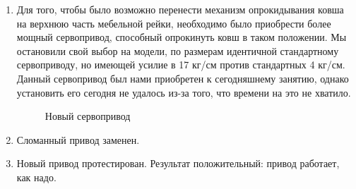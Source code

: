 \begin{enumerate}
\begin{enumerate}
	  \item Для того, чтобы было возможно перенести механизм опрокидывания ковша на верхнюю часть мебельной рейки, необходимо было приобрести более мощный сервопривод, способный опрокинуть ковш в таком положении. Мы остановили свой выбор на модели, по размерам идентичной стандартному сервоприводу, но имеющей усилие в 17 кг/см против стандартных 4 кг/см. Данный сервопривод был нами приобретен к сегодняшнему занятию, однако установить его сегодня не удалось из-за того, что времени на это не хватило.
	  \begin{figure}[H]
	  	\begin{minipage}[h]{1\linewidth}
	  		\caption{Новый сервопривод}
	  	\end{minipage}
	  \end{figure}
	  	
	  \item Сломанный привод заменен.
	  
	  \item Новый привод протестирован. Результат положительный: привод работает, как надо.
	  

\end{enumerate}
\end{enumerate}
